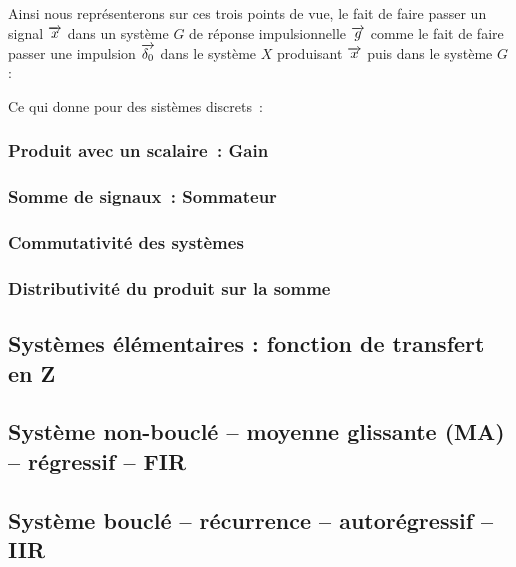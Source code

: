 Ainsi nous représenterons sur ces trois points de vue, le fait de
faire passer un signal $\overrightarrow{x}$ dans un système $G$ de réponse
impulsionnelle $\overrightarrow{g}$ comme le fait de faire passer une impulsion $\d0$
dans le système $X$ produisant $\overrightarrow{x}$ puis dans le système $G$ :


Ce qui donne pour des sistèmes discrets~:


\subsubsection{Produit avec un scalaire~: Gain}

\subsubsection{Somme de signaux~: Sommateur}

\subsubsection{Commutativité des systèmes}


\subsubsection{Distributivité du produit sur la somme}


\subsubsection{}
\subsection{Systèmes élémentaires : fonction de transfert en Z}
\subsection{Système non-bouclé -- moyenne glissante (MA) -- régressif --
  FIR}
\subsection{Système bouclé -- récurrence -- autorégressif -- IIR}

